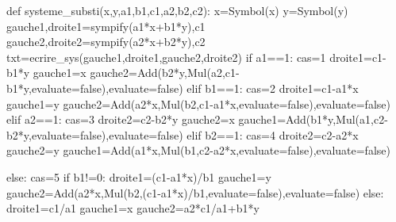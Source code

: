 \begin{pycode}
{def systeme_substi(x,y,a1,b1,c1,a2,b2,c2):
    x=Symbol(x)
    y=Symbol(y)
    gauche1,droite1=sympify(a1*x+b1*y),c1
    gauche2,droite2=sympify(a2*x+b2*y),c2
    txt=ecrire_sys(gauche1,droite1,gauche2,droite2)
    if a1==1:
        cas=1
        droite1=c1-b1*y
        gauche1=x
        gauche2=Add(b2*y,Mul(a2,c1-b1*y,evaluate=false),evaluate=false)
    elif b1==1:
        cas=2
        droite1=c1-a1*x
        gauche1=y
        gauche2=Add(a2*x,Mul(b2,c1-a1*x,evaluate=false),evaluate=false)
    elif a2==1:
        cas=3
        droite2=c2-b2*y
        gauche2=x
        gauche1=Add(b1*y,Mul(a1,c2-b2*y,evaluate=false),evaluate=false)
    elif b2==1:
        cas=4
        droite2=c2-a2*x
        gauche2=y
        gauche1=Add(a1*x,Mul(b1,c2-a2*x,evaluate=false),evaluate=false)

    else:
        cas=5
        if b1!=0:
            droite1=(c1-a1*x)/b1
            gauche1=y
            gauche2=Add(a2*x,Mul(b2,(c1-a1*x)/b1,evaluate=false),evaluate=false)
        else:
            droite1=c1/a1
            gauche1=x
            gauche2=a2*c1/a1+b1*y

}
\end{pycode}
